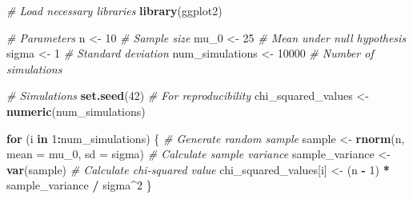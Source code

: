\documentclass[
]{book}
\newenvironment{Shaded}{\begin{snugshade}}{\end{snugshade}}
\newcommand{\AttributeTok}[1]{\textcolor[rgb]{0.13,0.29,0.53}{#1}}
\newcommand{\CommentTok}[1]{\textcolor[rgb]{0.56,0.35,0.01}{\textit{#1}}}
\newcommand{\ControlFlowTok}[1]{\textcolor[rgb]{0.13,0.29,0.53}{\textbf{#1}}}
\newcommand{\DecValTok}[1]{\textcolor[rgb]{0.00,0.00,0.81}{#1}}
\newcommand{\FunctionTok}[1]{\textcolor[rgb]{0.13,0.29,0.53}{\textbf{#1}}}
\newcommand{\NormalTok}[1]{#1}
\newcommand{\OtherTok}[1]{\textcolor[rgb]{0.56,0.35,0.01}{#1}}
\newcommand{\SpecialCharTok}[1]{\textcolor[rgb]{0.81,0.36,0.00}{\textbf{#1}}}
\begin{document}
\begin{Shaded}
\begin{Highlighting}[]
\CommentTok{\# Load necessary libraries}
\FunctionTok{library}\NormalTok{(ggplot2)}

\CommentTok{\# Parameters}
\NormalTok{n }\OtherTok{\textless{}{-}} \DecValTok{10}            \CommentTok{\# Sample size}
\NormalTok{mu\_0 }\OtherTok{\textless{}{-}} \DecValTok{25}         \CommentTok{\# Mean under null hypothesis}
\NormalTok{sigma }\OtherTok{\textless{}{-}} \DecValTok{1}         \CommentTok{\# Standard deviation}
\NormalTok{num\_simulations }\OtherTok{\textless{}{-}} \DecValTok{10000}  \CommentTok{\# Number of simulations}

\CommentTok{\# Simulations}
\FunctionTok{set.seed}\NormalTok{(}\DecValTok{42}\NormalTok{)  }\CommentTok{\# For reproducibility}
\NormalTok{chi\_squared\_values }\OtherTok{\textless{}{-}} \FunctionTok{numeric}\NormalTok{(num\_simulations)}

\ControlFlowTok{for}\NormalTok{ (i }\ControlFlowTok{in} \DecValTok{1}\SpecialCharTok{:}\NormalTok{num\_simulations) \{}
  \CommentTok{\# Generate random sample}
\NormalTok{  sample }\OtherTok{\textless{}{-}} \FunctionTok{rnorm}\NormalTok{(n, }\AttributeTok{mean =}\NormalTok{ mu\_0, }\AttributeTok{sd =}\NormalTok{ sigma)}
  \CommentTok{\# Calculate sample variance}
\NormalTok{  sample\_variance }\OtherTok{\textless{}{-}} \FunctionTok{var}\NormalTok{(sample)}
  \CommentTok{\# Calculate chi{-}squared value}
\NormalTok{  chi\_squared\_values[i] }\OtherTok{\textless{}{-}}\NormalTok{ (n }\SpecialCharTok{{-}} \DecValTok{1}\NormalTok{) }\SpecialCharTok{*}\NormalTok{ sample\_variance }\SpecialCharTok{/}\NormalTok{ sigma}\SpecialCharTok{\^{}}\DecValTok{2}
\NormalTok{\}}


\end{Highlighting}
\end{Shaded}
\end{document}
